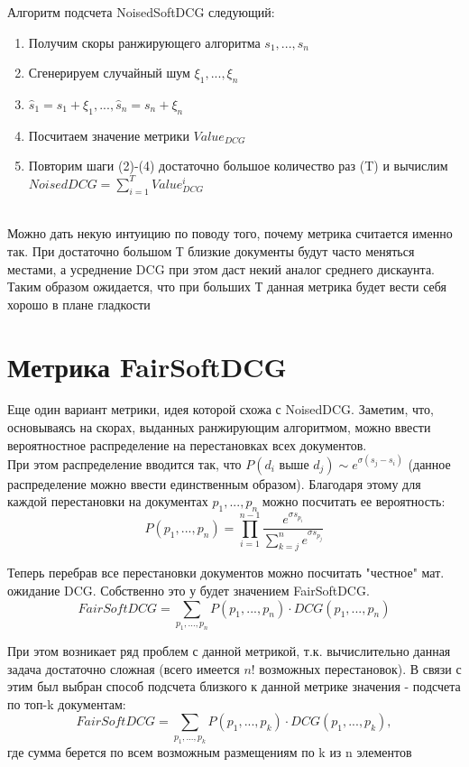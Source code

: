 \documentclass[12pt,a4paper]{amsart}
\theoremstyle{definition}
\theoremstyle{definition}
\newcommand{\Sum}{\sum\limits}
\renewcommand\t{\text}
\begin{document}
Алгоритм подсчета NoisedSoftDCG следующий:

\begin{enumerate}
\item Получим скоры ранжирующего алгоритма $s_1,...,s_n$
\item Сгенерируем случайный шум $\xi_1,...,\xi_n$
\item $\hat{s}_1=s_1 + \xi_1,...,\hat{s}_n=s_n + \xi_n$
\item Посчитаем значение метрики $Value_{DCG}$
\item Повторим шаги (2)-(4) достаточно большое количество раз (T) и вычислим 
$NoisedDCG = \Sum_{i=1}^T Value_{DCG}^i$
\end{enumerate}

~\\

Можно дать некую интуицию по поводу того, почему метрика считается именно так. При достаточно большом Т близкие документы будут часто меняться местами, а усреднение DCG при этом даст некий аналог среднего дискаунта. Таким образом ожидается, что при больших Т данная метрика будет вести себя хорошо в плане гладкости  



\newpage
\section{Метрика FairSoftDCG}

Еще один вариант метрики, идея которой схожа с NoisedDCG. Заметим, что, основываясь на скорах, выданных ранжирующим алгоритмом, можно ввести вероятностное распределение на перестановках всех документов. \\

При этом распределение вводится так, что $P(d_i \t{ выше } d_j) \sim e^{\sigma(s_j - s_i)}$ (данное распределение можно ввести единственным образом). Благодаря этому для каждой перестановки на документах $p_1,...,p_n$ можно посчитать ее вероятность:
$$P(p_1,...,p_n) = \prod\limits_{i=1}^{n - 1} \frac{e^{\sigma s_{p_i}}}{\Sum_{k=j}^n e^{\sigma s_{p_j}}}$$

Теперь перебрав все перестановки документов можно посчитать "честное" мат. ожидание DCG. Собственно это у будет значением FairSoftDCG.
$$FairSoftDCG = \Sum_{p_1,...,p_n} P(p_1,...,p_n) \cdot DCG(p_1,...,p_n)$$

При этом возникает ряд проблем с данной метрикой, т.к. вычислительно данная задача достаточно сложная (всего имеется $n!$ возможных перестановок). В связи с этим был выбран способ подсчета близкого к данной метрике значения - подсчета по топ-k документам:
$$FairSoftDCG = \Sum_{p_1,...,p_k} P(p_1,...,p_k) \cdot DCG(p_1,...,p_k),$$ где сумма берется по всем возможным размещениям по k из n элементов
\end{document}
